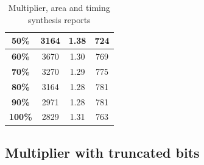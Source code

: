 \documentclass[a4paper]{article}
\begin{document}
\begin{table}[hbtp]
\begin{tabular}{|c|c|c|c|}
		\textbf{50\%}                                                                   & 		3164                                                                       & 		1.38                                                                       & 		724                                                                                  \\ \hline
		\textbf{60\%}                                                                   & 		3670                                                                       & 		1.30                                                                       & 		769                                                                                  \\ \hline
		\textbf{70\%}                                                                   & 		3270                                                                       & 		1.29                                                                       & 		775                                                                                  \\ \hline
		\textbf{80\%}                                                                   & 		3164                                                                       & 		1.28                                                                       & 		781                                                                                  \\ \hline
		\textbf{90\%}                                                                   & 		2971                                                                       & 		1.28                                                                       & 		781                                                                                  \\ \hline
		\textbf{100\%}                                                                  & 		2829                                                                       & 		1.31                                                                       & 		763                                                                                  \\ \hline
		\end{tabular}
		\caption{Multiplier, area and timing synthesis reports}
		\label{tab:mult_syn}
	\end{table}

	\subsection{Multiplier with truncated bits}
	
\end{document}
